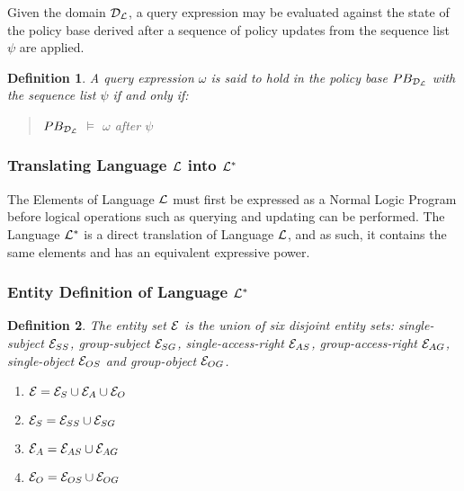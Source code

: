 \documentclass[10pt, twocolumn]{article}
\newtheorem{definition}{Definition}
\begin{document}
        Given the domain ${\cal D}_{\cal L}$, a query expression may be
        evaluated against the state of the policy base derived after a sequence
        of policy updates from the sequence list $\psi$ are applied.

        \begin{definition}
          A query expression $\omega$ is said to hold in the policy base
          $PB_{{\cal D}_{\cal L}}$ with the sequence list $\psi$ if and only
          if:

          \begin{quote}
            $PB_{{\cal D}_{\cal L}}$ $\models$ $\omega$ after $\psi$
          \end{quote}
          
        \end{definition}

      \subsubsection{Translating Language ${\cal L}$ into ${\cal L}^{*}$}

        The Elements of Language ${\cal L}$ must first be expressed as a Normal
        Logic Program before logical operations such as querying and updating
        can be performed. The Language ${\cal L}^{*}$ is a direct translation
        of Language ${\cal L}$, and as such, it contains the same elements and
        has an equivalent expressive power.

      \subsubsection{Entity Definition of Language ${\cal L}^{*}$}

        \begin{definition}

          The entity set ${\cal E}$ is the union of six disjoint entity sets:
          single-subject ${\cal E}_{SS}$, group-subject ${\cal E}_{SG}$,
          single-access-right ${\cal E}_{AS}$, group-access-right
          ${\cal E}_{AG}$, single-object ${\cal E}_{OS}$ and group-object
          ${\cal E}_{OG}$.

          \begin{enumerate}
            \item
              ${\cal E} = {\cal E}_{S} \cup {\cal E}_{A} \cup {\cal E}_{O}$
            \item
              ${\cal E}_{S} = {\cal E}_{SS} \cup {\cal E}_{SG}$
            \item
              ${\cal E}_{A} = {\cal E}_{AS} \cup {\cal E}_{AG}$
            \item
              ${\cal E}_{O} = {\cal E}_{OS} \cup {\cal E}_{OG}$
          \end{enumerate}

        \end{definition}
\end{document}
